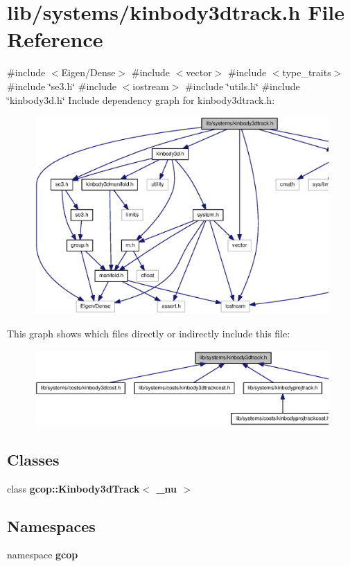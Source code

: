 \section{lib/systems/kinbody3dtrack.h \-File \-Reference}
\label{kinbody3dtrack_8h}
{\ttfamily \#include $<$\-Eigen/\-Dense$>$}\*
{\ttfamily \#include $<$vector$>$}\*
{\ttfamily \#include $<$type\-\_\-traits$>$}\*
{\ttfamily \#include \char`\"{}se3.\-h\char`\"{}}\*
{\ttfamily \#include $<$iostream$>$}\*
{\ttfamily \#include \char`\"{}utils.\-h\char`\"{}}\*
{\ttfamily \#include \char`\"{}kinbody3d.\-h\char`\"{}}\*
\-Include dependency graph for kinbody3dtrack.\-h\-:
\nopagebreak
\begin{figure}[H]
\begin{center}
\leavevmode
\includegraphics[width=350pt]{kinbody3dtrack_8h__incl}
\end{center}
\end{figure}
\-This graph shows which files directly or indirectly include this file\-:
\nopagebreak
\begin{figure}[H]
\begin{center}
\leavevmode
\includegraphics[width=350pt]{kinbody3dtrack_8h__dep__incl}
\end{center}
\end{figure}
\subsection*{\-Classes}
\begin{DoxyCompactItemize}
\item 
class {\bf gcop\-::\-Kinbody3d\-Track$<$ \-\_\-nu $>$}
\end{DoxyCompactItemize}
\subsection*{\-Namespaces}
\begin{DoxyCompactItemize}
\item 
namespace {\bf gcop}
\end{DoxyCompactItemize}
